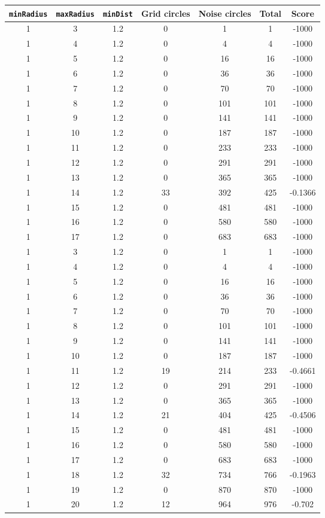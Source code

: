 \documentclass[letterpaper, 12pt]{article}
\begin{document}
\begin{longtable}{|c|c|c|c|c|c|c|}
\hline
\textbf{\texttt{minRadius}} & \textbf{\texttt{maxRadius}} & \textbf{\texttt{minDist}} & \textbf{Grid circles} & \textbf{Noise circles} & \textbf{Total} & \textbf{Score} \\
\hline
1 & 3 & 1.2 & 0 & 1 & 1 & -1000 \\
\hline
1 & 4 & 1.2 & 0 & 4 & 4 & -1000 \\
\hline
1 & 5 & 1.2 & 0 & 16 & 16 & -1000 \\
\hline
1 & 6 & 1.2 & 0 & 36 & 36 & -1000 \\
\hline
1 & 7 & 1.2 & 0 & 70 & 70 & -1000 \\
\hline
1 & 8 & 1.2 & 0 & 101 & 101 & -1000 \\
\hline
1 & 9 & 1.2 & 0 & 141 & 141 & -1000 \\
\hline
1 & 10 & 1.2 & 0 & 187 & 187 & -1000 \\
\hline
1 & 11 & 1.2 & 0 & 233 & 233 & -1000 \\
\hline
1 & 12 & 1.2 & 0 & 291 & 291 & -1000 \\
\hline
1 & 13 & 1.2 & 0 & 365 & 365 & -1000 \\
\hline
1 & 14 & 1.2 & 33 & 392 & 425 & -0.1366 \\
\hline
1 & 15 & 1.2 & 0 & 481 & 481 & -1000 \\
\hline
1 & 16 & 1.2 & 0 & 580 & 580 & -1000 \\
\hline
1 & 17 & 1.2 & 0 & 683 & 683 & -1000 \\
\hline
1 & 3 & 1.2 & 0 & 1 & 1 & -1000 \\
\hline
1 & 4 & 1.2 & 0 & 4 & 4 & -1000 \\
\hline
1 & 5 & 1.2 & 0 & 16 & 16 & -1000 \\
\hline
1 & 6 & 1.2 & 0 & 36 & 36 & -1000 \\
\hline
1 & 7 & 1.2 & 0 & 70 & 70 & -1000 \\
\hline
1 & 8 & 1.2 & 0 & 101 & 101 & -1000 \\
\hline
1 & 9 & 1.2 & 0 & 141 & 141 & -1000 \\
\hline
1 & 10 & 1.2 & 0 & 187 & 187 & -1000 \\
\hline
1 & 11 & 1.2 & 19 & 214 & 233 & -0.4661 \\
\hline
1 & 12 & 1.2 & 0 & 291 & 291 & -1000 \\
\hline
1 & 13 & 1.2 & 0 & 365 & 365 & -1000 \\
\hline
1 & 14 & 1.2 & 21 & 404 & 425 & -0.4506 \\
\hline
1 & 15 & 1.2 & 0 & 481 & 481 & -1000 \\
\hline
1 & 16 & 1.2 & 0 & 580 & 580 & -1000 \\
\hline
1 & 17 & 1.2 & 0 & 683 & 683 & -1000 \\
\hline
1 & 18 & 1.2 & 32 & 734 & 766 & -0.1963 \\
\hline
1 & 19 & 1.2 & 0 & 870 & 870 & -1000 \\
\hline
1 & 20 & 1.2 & 12 & 964 & 976 & -0.702 \\
\hline
\end{longtable}
\end{document}
